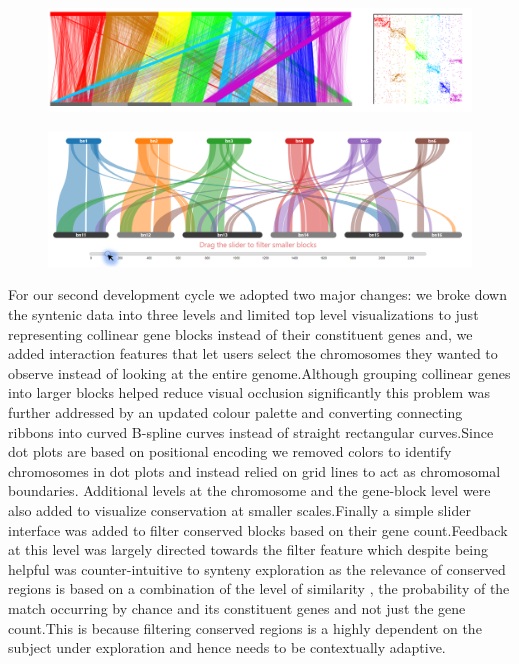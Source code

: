 \begin{figure}
  \centering
  \includegraphics[width=1\linewidth]{images/ch_4_first_iteration.PNG}
  \label{fig:ch_4_first_iteration}
\end{figure}

\begin{figure}[h]
  \centering
  \includegraphics[width=0.85\linewidth]{images/ch_4_base_viewer.PNG}
  \label{fig:ch_4_base_viewer}
\end{figure}


For our second development cycle we adopted two major changes: we broke down the syntenic data into three levels and limited top level visualizations to just representing collinear gene blocks instead of their constituent genes and, we added interaction features that let users select the chromosomes they wanted to observe instead of looking at the entire genome.Although grouping collinear genes into larger blocks helped reduce visual occlusion significantly this problem was further addressed by an updated colour palette and converting connecting ribbons into curved B-spline curves instead of straight rectangular curves.Since dot plots are based on positional encoding we removed colors to identify chromosomes in dot plots and instead relied on grid lines to act as chromosomal boundaries. Additional levels at the chromosome and the gene-block level were also added to visualize conservation at smaller scales.Finally a simple slider interface was added to filter conserved blocks based on their gene count.Feedback at this level was largely directed towards the filter feature which despite being helpful was counter-intuitive  to synteny exploration as the relevance of conserved regions is based on a combination of the level of similarity , the probability of the match occurring by chance and its constituent genes and not just the gene count.This is because filtering conserved regions is a highly dependent on the subject under exploration and hence needs to be contextually adaptive.


